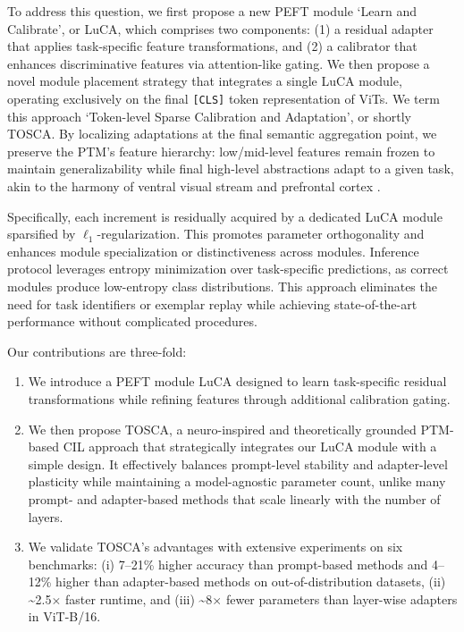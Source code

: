 To address this question, we first propose a new PEFT module ‘Learn and Calibrate’, or LuCA, which comprises two components: (1) a residual adapter that applies task-specific feature transformations, and (2) a calibrator that enhances discriminative features via attention-like gating. 
We then propose a novel module placement strategy that integrates a single LuCA module, operating exclusively on the final \texttt{[CLS]} token representation of ViTs. We term this approach ‘Token-level Sparse Calibration and Adaptation’, or shortly TOSCA.
By localizing adaptations at the final semantic aggregation point, we preserve the PTM’s feature hierarchy: low/mid-level features remain frozen to maintain generalizability while final high-level abstractions adapt to a given task, akin to the harmony of ventral visual stream \cite{ventral, ventral1} and prefrontal cortex \cite{cortex, cortex1, cortex2}.

Specifically, each increment is residually acquired by a dedicated LuCA module sparsified by $\ell_1$-regularization. This promotes parameter orthogonality and enhances module specialization or distinctiveness across modules. Inference protocol leverages entropy minimization over task-specific predictions, as correct modules produce low-entropy class distributions. 
This approach eliminates the need for task identifiers or exemplar replay while achieving state-of-the-art performance without complicated procedures. 

\vspace{1mm}
Our contributions are three-fold:
\begin{enumerate}[label=\Roman*., leftmargin=*, align=left]
\item We introduce a PEFT module LuCA designed to learn task-specific residual transformations while refining features through additional calibration gating.

\item We then propose TOSCA, a neuro-inspired and theoretically grounded PTM-based CIL approach that strategically integrates our LuCA module with a simple design. It effectively balances prompt-level stability and adapter-level plasticity while maintaining a model-agnostic parameter count, unlike many prompt- and adapter-based methods that scale linearly with the number of layers.

\item We validate TOSCA's advantages with extensive experiments on six benchmarks: (i) 7–21\% higher accuracy than prompt-based methods and 4–12\% higher than adapter-based methods on out-of-distribution datasets, (ii) \textasciitilde{2.5}$\times$ faster runtime, and (iii) \textasciitilde{8}$\times$ fewer parameters than layer-wise adapters in ViT-B/16.
\end{enumerate}





